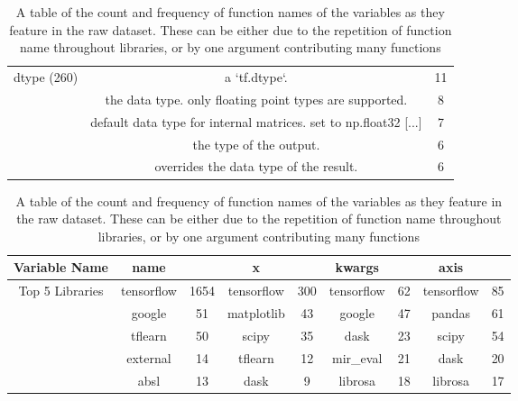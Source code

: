 \begin{table}[h]
\begin{center}
\begin{tabular}{c | c | c }
\\
\hline
dtype   (260) &  a `tf.dtype`.                                                       & 11 \\
& the data type. only floating point types are supported.             & 8 \\
& default data type for internal matrices. set to np.float32 [...]   & 7 \\
& the type of the output.                                             & 6 \\
& overrides the data type of the result.                              & 6 \\


    \end{tabular}
        \caption { A table of the count and frequency of function names of the variables as they feature in the raw dataset. 
        These can be either due to the repetition of function name throughout libraries, or by one argument contributing many functions }
    \label{table:descriptions_for_names} 
    \end{center}
\end{table}

\begin{table}[h]
    \begin{center}
    \begin{tabular}{c | c | c | c | c | c | c | c | c  }       

 Variable Name &name         & &  x            &  & kwargs   & &  axis    \\
\hline
Top 5 Libraries  &tensorflow         & 1654     & tensorflow    & 300       & tensorflow    & 62       & tensorflow    & 85 \\
&google             & 51       & matplotlib    & 43       & google        & 47       & pandas        & 61       \\
&tflearn            & 50       & scipy         & 35       & dask          & 23       & scipy         & 54       \\
&external           & 14       & tflearn       & 12       & mir\_eval     & 21       & dask          & 20       \\ 
&absl               & 13       & dask          & 9        & librosa       & 18       & librosa       & 17       \\



    \end{tabular}
        \caption { A table of the count and frequency of function names of the variables as they feature in the raw dataset. 
        These can be either due to the repetition of function name throughout libraries, or by one argument contributing many functions }
    \label{table:packages_for_names} 
    \end{center}
\end{table}